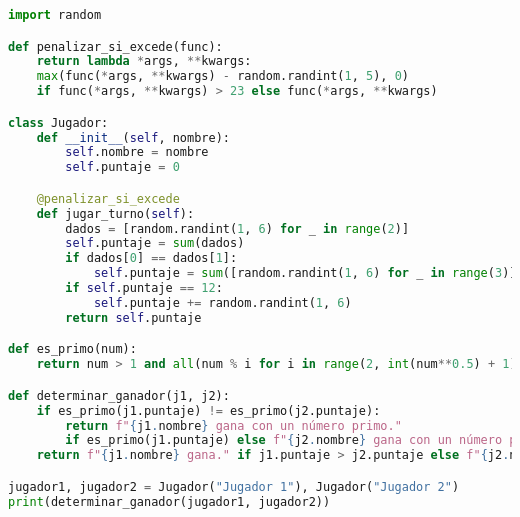 \documentclass{article}
\begin{document}
\begin{lstlisting}[language=Python, caption=Código en Python]
import random

def penalizar_si_excede(func):
    return lambda *args, **kwargs: 
    max(func(*args, **kwargs) - random.randint(1, 5), 0) 
    if func(*args, **kwargs) > 23 else func(*args, **kwargs)

class Jugador:
    def __init__(self, nombre):
        self.nombre = nombre
        self.puntaje = 0

    @penalizar_si_excede
    def jugar_turno(self):
        dados = [random.randint(1, 6) for _ in range(2)]
        self.puntaje = sum(dados)
        if dados[0] == dados[1]:
            self.puntaje = sum([random.randint(1, 6) for _ in range(3)])
        if self.puntaje == 12:
            self.puntaje += random.randint(1, 6)
        return self.puntaje

def es_primo(num):
    return num > 1 and all(num % i for i in range(2, int(num**0.5) + 1))

def determinar_ganador(j1, j2):
    if es_primo(j1.puntaje) != es_primo(j2.puntaje):
        return f"{j1.nombre} gana con un número primo." 
        if es_primo(j1.puntaje) else f"{j2.nombre} gana con un número primo."
    return f"{j1.nombre} gana." if j1.puntaje > j2.puntaje else f"{j2.nombre} gana."

jugador1, jugador2 = Jugador("Jugador 1"), Jugador("Jugador 2")
print(determinar_ganador(jugador1, jugador2))

\end{lstlisting}
\end{document}
